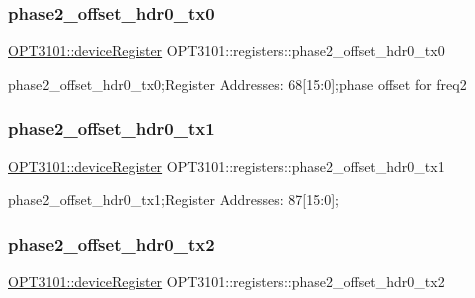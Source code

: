 \subsubsection{\texorpdfstring{phase2\+\_\+offset\+\_\+hdr0\+\_\+tx0}{phase2\_offset\_hdr0\_tx0}}
{\footnotesize\ttfamily \mbox{\hyperlink{class_o_p_t3101_1_1device_register}{O\+P\+T3101\+::device\+Register}} O\+P\+T3101\+::registers\+::phase2\+\_\+offset\+\_\+hdr0\+\_\+tx0}



phase2\+\_\+offset\+\_\+hdr0\+\_\+tx0;Register Addresses\+: 68\mbox{[}15\+:0\mbox{]};phase offset for freq2 

\mbox{\label{class_o_p_t3101_1_1registers_a36f5ab204e85f8e82fa6fea617a86df2}} 
\subsubsection{\texorpdfstring{phase2\+\_\+offset\+\_\+hdr0\+\_\+tx1}{phase2\_offset\_hdr0\_tx1}}
{\footnotesize\ttfamily \mbox{\hyperlink{class_o_p_t3101_1_1device_register}{O\+P\+T3101\+::device\+Register}} O\+P\+T3101\+::registers\+::phase2\+\_\+offset\+\_\+hdr0\+\_\+tx1}



phase2\+\_\+offset\+\_\+hdr0\+\_\+tx1;Register Addresses\+: 87\mbox{[}15\+:0\mbox{]}; 

\mbox{\label{class_o_p_t3101_1_1registers_a2933b108b9d6edf0dfdc94da6d65afb1}} 
\subsubsection{\texorpdfstring{phase2\+\_\+offset\+\_\+hdr0\+\_\+tx2}{phase2\_offset\_hdr0\_tx2}}
{\footnotesize\ttfamily \mbox{\hyperlink{class_o_p_t3101_1_1device_register}{O\+P\+T3101\+::device\+Register}} O\+P\+T3101\+::registers\+::phase2\+\_\+offset\+\_\+hdr0\+\_\+tx2}



